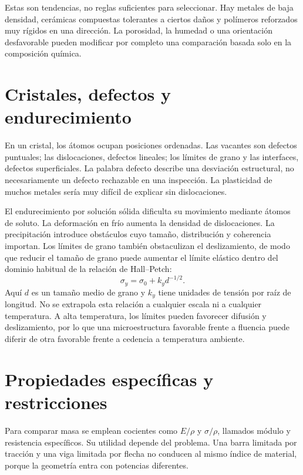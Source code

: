 Estas son tendencias, no reglas suficientes para seleccionar. Hay metales de baja densidad, cerámicas compuestas tolerantes a ciertos daños y polímeros reforzados muy rígidos en una dirección. La porosidad, la humedad o una orientación desfavorable pueden modificar por completo una comparación basada solo en la composición química.
\section{Cristales, defectos y endurecimiento}
En un cristal, los átomos ocupan posiciones ordenadas. Las vacantes son defectos puntuales; las dislocaciones, defectos lineales; los límites de grano y las interfaces, defectos superficiales. La palabra defecto describe una desviación estructural, no necesariamente un defecto rechazable en una inspección. La plasticidad de muchos metales sería muy difícil de explicar sin dislocaciones.

El endurecimiento por solución sólida dificulta su movimiento mediante átomos de soluto. La deformación en frío aumenta la densidad de dislocaciones. La precipitación introduce obstáculos cuyo tamaño, distribución y coherencia importan. Los límites de grano también obstaculizan el deslizamiento, de modo que reducir el tamaño de grano puede aumentar el límite elástico dentro del dominio habitual de la relación de Hall--Petch:
\begin{equation}\sigma_y=\sigma_0+k_y d^{-1/2}.\label{eq:hallpetch}\end{equation}
Aquí $d$ es un tamaño medio de grano y $k_y$ tiene unidades de tensión por raíz de longitud. No se extrapola esta relación a cualquier escala ni a cualquier temperatura. A alta temperatura, los límites pueden favorecer difusión y deslizamiento, por lo que una microestructura favorable frente a fluencia puede diferir de otra favorable frente a cedencia a temperatura ambiente.
\section{Propiedades específicas y restricciones}
Para comparar masa se emplean cocientes como $E/\rho$ y $\sigma/\rho$, llamados módulo y resistencia específicos. Su utilidad depende del problema. Una barra limitada por tracción y una viga limitada por flecha no conducen al mismo índice de material, porque la geometría entra con potencias diferentes.

